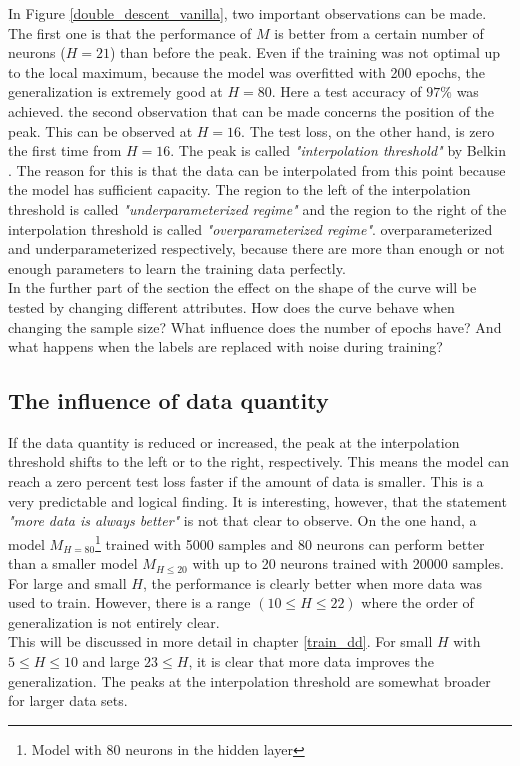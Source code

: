 In Figure \ref{double_descent_vanilla}, two important observations can be made. The first one is that the performance of $M$ is better from a certain number of neurons ($H = 21$) than before the peak. Even if the training was not optimal up to the local maximum, because the model was overfitted with 200 epochs, the generalization is extremely good at $H = 80$. Here a test accuracy of $97\%$ was achieved. 
the second observation that can be made concerns the position of the peak. This can be observed at $H = 16$. The test loss, on the other hand, is zero the first time from $H = 16$. The peak is called \textit{"interpolation threshold"} by Belkin \cite{belkin}. The reason for this is that the data can be interpolated from this point because the model has sufficient capacity. The region to the left of the interpolation threshold is called \textit{"underparameterized regime"} and the region to the right of the interpolation threshold is called \textit{"overparameterized regime"}. overparameterized and underparameterized respectively, because there are more than enough or not enough parameters to learn the training data perfectly.\\
In the further part of the section the effect on the shape of the curve will be tested by changing different attributes. How does the curve behave when changing the sample size? What influence does the number of epochs have? And what happens when the labels are replaced with noise during training?

\subsection{The influence of data quantity}

If the data quantity is reduced or increased, the peak at the interpolation threshold shifts to the left or to the right, respectively. 
This means the model can reach a zero percent test loss faster if the amount of data is smaller. This is a very predictable and logical finding. It is interesting, however, that the statement \textit{"more data is always better"} is not that clear to observe. On the one hand, a model $M_{H=80}$\footnote{Model with $80$ neurons in the hidden layer} trained with 5000 samples and 80 neurons can perform better than a smaller model $M_{H \leq 20}$ with up to 20 neurons trained with 20000 samples.
For large and small $H$, the performance is clearly better when more data was used to train. However, there is a range $(10 \leq H \leq 22)$ where the order of generalization is not entirely clear.\\
This will be discussed in more detail in chapter \ref{train_dd}. For small $H$ with $5 \leq H \leq 10$ and large $23 \leq H $, it is clear that more data improves the generalization. The peaks at the interpolation threshold are somewhat broader for larger data sets.  

